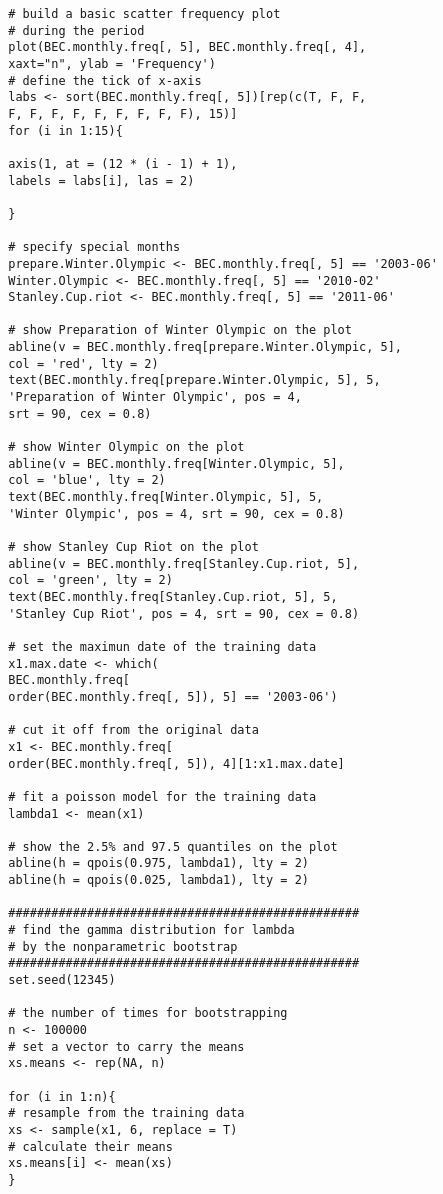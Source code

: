 \begin{enumerate}
\begin{verbatim}
		# build a basic scatter frequency plot 
		# during the period
		plot(BEC.monthly.freq[, 5], BEC.monthly.freq[, 4], 
		xaxt="n", ylab = 'Frequency')
		# define the tick of x-axis
		labs <- sort(BEC.monthly.freq[, 5])[rep(c(T, F, F, 
		F, F, F, F, F, F, F, F, F), 15)]
		for (i in 1:15){
		
		axis(1, at = (12 * (i - 1) + 1), 
		labels = labs[i], las = 2)
		
		}
		
		# specify special months
		prepare.Winter.Olympic <- BEC.monthly.freq[, 5] == '2003-06'
		Winter.Olympic <- BEC.monthly.freq[, 5] == '2010-02'
		Stanley.Cup.riot <- BEC.monthly.freq[, 5] == '2011-06'
		
		# show Preparation of Winter Olympic on the plot
		abline(v = BEC.monthly.freq[prepare.Winter.Olympic, 5], 
		col = 'red', lty = 2)
		text(BEC.monthly.freq[prepare.Winter.Olympic, 5], 5, 
		'Preparation of Winter Olympic', pos = 4, 
		srt = 90, cex = 0.8)
		
		# show Winter Olympic on the plot 
		abline(v = BEC.monthly.freq[Winter.Olympic, 5], 
		col = 'blue', lty = 2)
		text(BEC.monthly.freq[Winter.Olympic, 5], 5, 
		'Winter Olympic', pos = 4, srt = 90, cex = 0.8)
		
		# show Stanley Cup Riot on the plot 
		abline(v = BEC.monthly.freq[Stanley.Cup.riot, 5], 
		col = 'green', lty = 2)
		text(BEC.monthly.freq[Stanley.Cup.riot, 5], 5, 
		'Stanley Cup Riot', pos = 4, srt = 90, cex = 0.8)
		
		# set the maximun date of the training data
		x1.max.date <- which(
		BEC.monthly.freq[
		order(BEC.monthly.freq[, 5]), 5] == '2003-06')
		
		# cut it off from the original data
		x1 <- BEC.monthly.freq[
		order(BEC.monthly.freq[, 5]), 4][1:x1.max.date]
		
		# fit a poisson model for the training data
		lambda1 <- mean(x1)
		
		# show the 2.5% and 97.5 quantiles on the plot
		abline(h = qpois(0.975, lambda1), lty = 2)
		abline(h = qpois(0.025, lambda1), lty = 2)
		
		#################################################
		# find the gamma distribution for lambda 
		# by the nonparametric bootstrap
		#################################################
		set.seed(12345)
		
		# the number of times for bootstrapping
		n <- 100000
		# set a vector to carry the means
		xs.means <- rep(NA, n)
		
		for (i in 1:n){
		# resample from the training data
		xs <- sample(x1, 6, replace = T)
		# calculate their means
		xs.means[i] <- mean(xs)
		}
		

\end{verbatim}
\end{enumerate}
